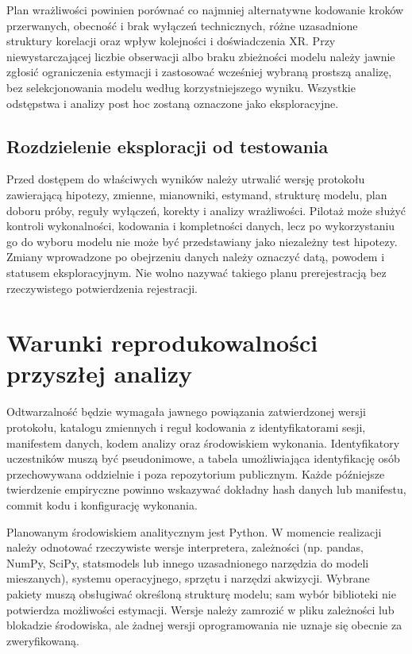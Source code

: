 \documentclass[11pt,a4paper]{article}
\begin{document}
Plan wrażliwości powinien porównać co najmniej alternatywne kodowanie kroków przerwanych, obecność i brak wyłączeń technicznych, różne uzasadnione struktury korelacji oraz wpływ kolejności i doświadczenia XR. Przy niewystarczającej liczbie obserwacji albo braku zbieżności modelu należy jawnie zgłosić ograniczenia estymacji i zastosować wcześniej wybraną prostszą analizę, bez selekcjonowania modelu według korzystniejszego wyniku. Wszystkie odstępstwa i analizy post hoc zostaną oznaczone jako eksploracyjne.

\subsection{Rozdzielenie eksploracji od testowania}
Przed dostępem do właściwych wyników należy utrwalić wersję protokołu zawierającą hipotezy, zmienne, mianowniki, estymand, strukturę modelu, plan doboru próby, reguły wyłączeń, korekty i analizy wrażliwości. Pilotaż może służyć kontroli wykonalności, kodowania i kompletności danych, lecz po wykorzystaniu go do wyboru modelu nie może być przedstawiany jako niezależny test hipotezy. Zmiany wprowadzone po obejrzeniu danych należy oznaczyć datą, powodem i statusem eksploracyjnym. Nie wolno nazywać takiego planu prerejestracją bez rzeczywistego potwierdzenia rejestracji.

\section{Warunki reprodukowalności przyszłej analizy}
Odtwarzalność będzie wymagała jawnego powiązania zatwierdzonej wersji protokołu, katalogu zmiennych i reguł kodowania z identyfikatorami sesji, manifestem danych, kodem analizy oraz środowiskiem wykonania. Identyfikatory uczestników muszą być pseudonimowe, a tabela umożliwiająca identyfikację osób przechowywana oddzielnie i poza repozytorium publicznym. Każde późniejsze twierdzenie empiryczne powinno wskazywać dokładny hash danych lub manifestu, commit kodu i konfigurację wykonania.

Planowanym środowiskiem analitycznym jest Python. W momencie realizacji należy odnotować rzeczywiste wersje interpretera, zależności (np. pandas, NumPy, SciPy, statsmodels lub innego uzasadnionego narzędzia do modeli mieszanych), systemu operacyjnego, sprzętu i narzędzi akwizycji. Wybrane pakiety muszą obsługiwać określoną strukturę modelu; sam wybór biblioteki nie potwierdza możliwości estymacji. Wersje należy zamrozić w pliku zależności lub blokadzie środowiska, ale żadnej wersji oprogramowania nie uznaje się obecnie za zweryfikowaną.
\end{document}
